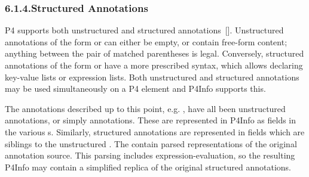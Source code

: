 \documentclass[11pt]{article}
\begin{document}
{%
\subsubsection{6.1.4.\hspace*{0.5em}Structured Annotations}\label{sec-structured-annotations}%

\noindent{}P4 supports both unstructured and structured annotations~[].
Unstructured annotations of the form  or  can
either be empty, or contain free-form content; anything between the pair of
matched parentheses is legal. Conversely, structured annotations of the form
 or  have a more prescribed syntax,
which allows declaring key-value lists or expression lists. Both unstructured
and structured annotations may be used simultaneously on a P4 element and
P4Info supports this.%

The annotations described up to this point, e.g. , have all been
unstructured annotations, or simply annotations. These are represented in
P4Info as  fields in the various s.
Similarly, structured annotations are represented in  fields which are siblings to the
unstructured . The  contain parsed
representations of the original annotation source. This parsing includes
expression-evaluation, so the resulting P4Info may contain a simplified
replica of the original structured annotations.%

}
\end{document}
